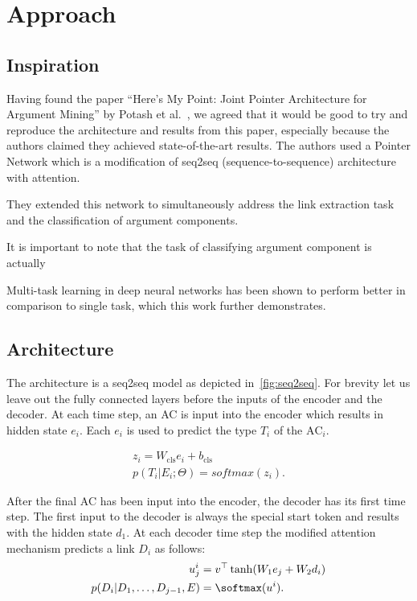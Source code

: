 \documentclass[onecolumn]{article}
\begin{document}
\section{Approach}
\subsection{Inspiration}
Having found the paper ``Here's My Point: Joint Pointer Architecture for Argument Mining'' by Potash et al.~\cite{potash2017here}, we agreed that it
would be good to try and reproduce the architecture and results from this paper, especially because the authors claimed they achieved
state-of-the-art results. The authors used a Pointer Network which is a modification of seq2seq (sequence-to-sequence) architecture with attention.

They extended this network to simultaneously address the link extraction task and the classification of argument components.

It is important to note that the task of classifying argument component is actually

Multi-task learning in deep neural networks has been shown to perform better in comparison to single task, which this work further demonstrates.

\subsection{Architecture}
The architecture is a seq2seq model as depicted in~\autoref{fig:seq2seq}.
For brevity let us leave out the fully connected layers before the inputs of the encoder and the decoder.
At each time step, an AC is input into the encoder which results in hidden state $e_i$.
Each $e_i$ is used to predict the type $T_i$ of the $\text{AC}_i$.

\begin{align*}
    z_i = W_{\text{cls}} e_i + b_{\text{cls}}\\
    p(T_i|E_i;\Theta) = softmax(z_i).
\end{align*}


After the final AC has been input into the encoder, the decoder has its first time step.
The first input to the decoder is always the special start token and results with the hidden state $d_1$.
At each decoder time step the modified attention mechanism predicts a link $D_i$ as follows:
\begin{align*}
    u_j^i &= v^\top \tanh(W_1e_j + W_2d_i)\\
    p(D_i|D_1,\dots,D_{j-1},E) &= \softmax(u^i).
\end{align*}
\end{document}
